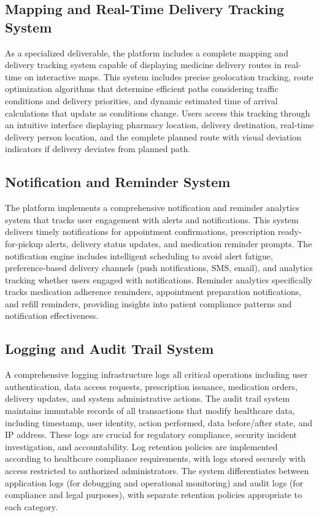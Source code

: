 \documentclass[12pt,a4paper]{report}
\begin{document}
\subsection{Mapping and Real-Time Delivery Tracking System}

As a specialized deliverable, the platform includes a complete mapping and delivery tracking system capable of displaying medicine delivery routes in real-time on interactive maps. This system includes precise geolocation tracking, route optimization algorithms that determine efficient paths considering traffic conditions and delivery priorities, and dynamic estimated time of arrival calculations that update as conditions change. Users access this tracking through an intuitive interface displaying pharmacy location, delivery destination, real-time delivery person location, and the complete planned route with visual deviation indicators if delivery deviates from planned path.

\subsection{Notification and Reminder System}

The platform implements a comprehensive notification and reminder analytics system that tracks user engagement with alerts and notifications. This system delivers timely notifications for appointment confirmations, prescription ready-for-pickup alerts, delivery status updates, and medication reminder prompts. The notification engine includes intelligent scheduling to avoid alert fatigue, preference-based delivery channels (push notifications, SMS, email), and analytics tracking whether users engaged with notifications. Reminder analytics specifically tracks medication adherence reminders, appointment preparation notifications, and refill reminders, providing insights into patient compliance patterns and notification effectiveness.

\subsection{Logging and Audit Trail System}

A comprehensive logging infrastructure logs all critical operations including user authentication, data access requests, prescription issuance, medication orders, delivery updates, and system administrative actions. The audit trail system maintains immutable records of all transactions that modify healthcare data, including timestamp, user identity, action performed, data before/after state, and IP address. These logs are crucial for regulatory compliance, security incident investigation, and accountability. Log retention policies are implemented according to healthcare compliance requirements, with logs stored securely with access restricted to authorized administrators. The system differentiates between application logs (for debugging and operational monitoring) and audit logs (for compliance and legal purposes), with separate retention policies appropriate to each category.
\end{document}
